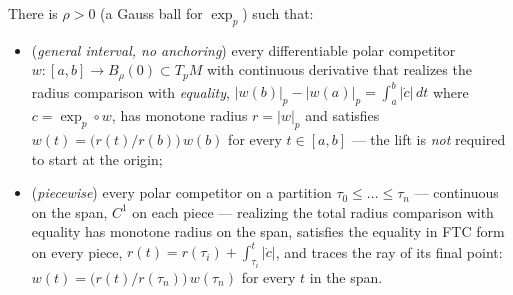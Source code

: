 \begin{lemma}
  \label{lem:dc-ch3-3-6-equality-ray-piecewise}
  \leanok
  There is $\rho>0$ (a Gauss ball for $\exp_p$) such that:
  \begin{itemize}
  \item (\emph{general interval, no anchoring}) every differentiable polar
    competitor $w:[a,b]\to B_\rho(0)\subset T_pM$ with continuous derivative
    that realizes the radius comparison with \emph{equality},
    $|w(b)|_p-|w(a)|_p=\int_a^b|\dot c|\,dt$ where $c=\exp_p\circ w$, has
    monotone radius $r=|w|_p$ and satisfies
    $w(t)=\bigl(r(t)/r(b)\bigr)\,w(b)$ for every $t\in[a,b]$ — the lift is
    \emph{not} required to start at the origin;
  \item (\emph{piecewise}) every polar competitor on a partition
    $\tau_0\le\dots\le\tau_n$ — continuous on the span, $C^1$ on each piece —
    realizing the total radius comparison with equality has monotone radius
    on the span, satisfies the equality in FTC form on every piece,
    $r(t)=r(\tau_i)+\int_{\tau_i}^t|\dot c|$, and traces the ray of its
    final point: $w(t)=\bigl(r(t)/r(\tau_n)\bigr)\,w(\tau_n)$ for every $t$
    in the span.
  \end{itemize}
\end{lemma}
